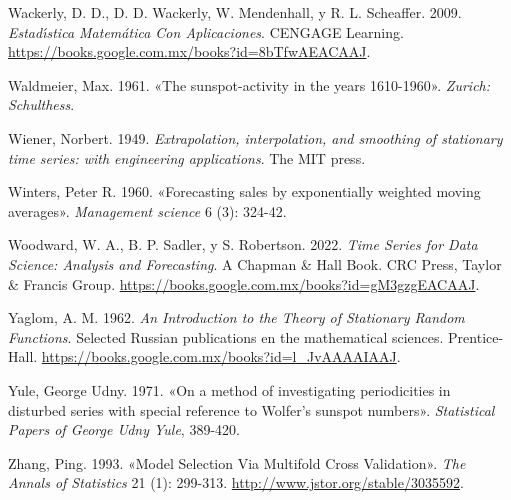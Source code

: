 \documentclass[
  us-letterpaper,
]{scrreprt}
\newlength{\cslhangindent}
\newenvironment{CSLReferences}[2] %
 {\begin{list}{}{%
  \setlength{\itemindent}{0pt}
  \setlength{\leftmargin}{0pt}
  \setlength{\parsep}{0pt}
  \ifodd #1
   \setlength{\leftmargin}{\cslhangindent}
   \setlength{\itemindent}{-1\cslhangindent}
  \fi
  \setlength{\itemsep}{#2\baselineskip}}}
 {\end{list}}
\theoremstyle{plain}
\theoremstyle{definition}
\theoremstyle{definition}
\theoremstyle{plain}
\theoremstyle{remark}
\begin{document}
\begin{CSLReferences}{1}{0}
Wackerly, D. D., D. D. Wackerly, W. Mendenhall, y R. L. Scheaffer. 2009.
\emph{Estad{ı́}stica Matem{á}tica Con Aplicaciones}. CENGAGE Learning.
\url{https://books.google.com.mx/books?id=8bTfwAEACAAJ}.

Waldmeier, Max. 1961. {«The sunspot-activity in the years 1610-1960»}.
\emph{Zurich: Schulthess}.

Wiener, Norbert. 1949. \emph{Extrapolation, interpolation, and smoothing
of stationary time series: with engineering applications}. The MIT
press.

Winters, Peter R. 1960. {«Forecasting sales by exponentially weighted
moving averages»}. \emph{Management science} 6 (3): 324-42.

Woodward, W. A., B. P. Sadler, y S. Robertson. 2022. \emph{Time Series
for Data Science: Analysis and Forecasting}. A Chapman \& Hall Book. CRC
Press, Taylor \& Francis Group.
\url{https://books.google.com.mx/books?id=gM3gzgEACAAJ}.

Yaglom, A. M. 1962. \emph{An Introduction to the Theory of Stationary
Random Functions}. Selected Russian publications en the mathematical
sciences. Prentice-Hall.
\url{https://books.google.com.mx/books?id=l_JvAAAAIAAJ}.

Yule, George Udny. 1971. {«On a method of investigating periodicities in
disturbed series with special reference to Wolfer's sunspot numbers»}.
\emph{Statistical Papers of George Udny Yule}, 389-420.

Zhang, Ping. 1993. {«Model Selection Via Multifold Cross Validation»}.
\emph{The Annals of Statistics} 21 (1): 299-313.
\url{http://www.jstor.org/stable/3035592}.

\end{CSLReferences}
\end{document}

